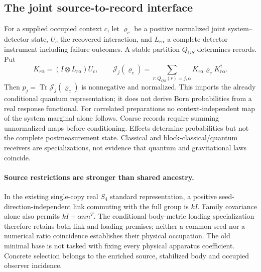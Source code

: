\documentclass[11pt]{article}
\begin{document}
\subsection{The joint source-to-record interface}
For a supplied occupied context $c$, let $\varrho_c$ be a positive normalized
joint system--detector state, $U_c$ the recovered interaction, and
$L_{r\alpha}$ a complete detector instrument including failure outcomes.
A stable partition $Q_{OS}$ determines records. Put
\[
 K_{r\alpha}=(I\otimes L_{r\alpha})U_c,\qquad
 \mathcal J_j(\varrho_c)=
 \sum_{r:Q_{OS}(r)=j,\alpha}K_{r\alpha}\varrho_c K_{r\alpha}^\dagger.
\]
Then $p_j=\operatorname{Tr}\mathcal J_j(\varrho_c)$ is nonnegative and
normalized. This imports the already conditional quantum representation;
it does not derive Born probabilities from a real response functional.
For correlated preparations no context-independent map of the system
marginal alone follows. Coarse records require summing unnormalized maps
before conditioning. Effects determine probabilities but not the complete
postmeasurement state. Classical and block-classical/quantum receivers are
specializations, not evidence that quantum and gravitational laws coincide.

\paragraph{Source restrictions are stronger than shared ancestry.}
In the existing single-copy real $S_4$ standard representation, a positive
seed-direction-independent link commuting with the full group is $kI$.
Family covariance alone also permits $kI+\alpha nn^T$. The conditional
body-metric loading specialization therefore retains both link and loading
premises; neither a common seed nor a numerical ratio coincidence establishes
their physical occupation. The old minimal base is not tasked with fixing
every physical apparatus coefficient. Concrete selection belongs to the
enriched source, stabilized body and occupied observer incidence.
\end{document}
